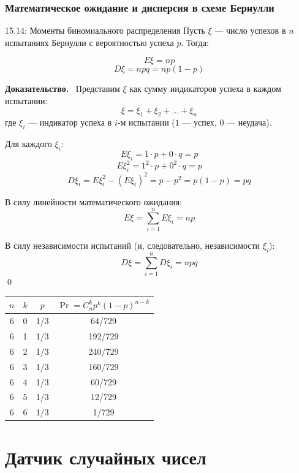\documentclass[a4paper,12pt]{article}
\newcommand{\myproof}{\textbf{Доказательство.}\ }
\begin{document}
	\subsubsection{Математическое ожидание и дисперсия в схеме Бернулли}
	
	\begin{theorembox}{15.14: Моменты биномиального распределения}
		Пусть \(\xi\) — число успехов в \(n\) испытаниях Бернулли с вероятностью успеха \(p\). Тогда:
		
		\[ E\xi = np \]
		\[ D\xi = npq = np(1-p) \]
	\end{theorembox}
	
	\myproof
	Представим \(\xi\) как сумму индикаторов успеха в каждом испытании:
	\[ \xi = \xi_1 + \xi_2 + \dots + \xi_n \]
	где \(\xi_i\) — индикатор успеха в \(i\)-м испытании (\(1\) — успех, \(0\) — неудача).
	
	Для каждого \(\xi_i\):
	\[ E\xi_i = 1 \cdot p + 0 \cdot q = p \]
	\[ E\xi_i^2 = 1^2 \cdot p + 0^2 \cdot q = p \]
	\[ D\xi_i = E\xi_i^2 - (E\xi_i)^2 = p - p^2 = p(1-p) = pq \]
	
	В силу линейности математического ожидания:
	\[ E\xi = \sum_{i=1}^n E\xi_i = np \]
	
	В силу независимости испытаний (и, следовательно, независимости \(\xi_i\)):
	\[ D\xi = \sum_{i=1}^n D\xi_i = npq \]
	\qed
	
	\begin{center}
		\begin{tabular}{|c|c|c|c|}
			\hline
			\(n\) & \(k\) & \(p\) & \(\Pr = C_n^k p^k (1-p)^{n-k}\) \\ \hline
			6 & 0 & 1/3 & 64/729 \\
			6 & 1 & 1/3 & 192/729 \\
			6 & 2 & 1/3 & 240/729 \\
			6 & 3 & 1/3 & 160/729 \\
			6 & 4 & 1/3 & 60/729 \\
			6 & 5 & 1/3 & 12/729 \\
			6 & 6 & 1/3 & 1/729 \\ \hline
		\end{tabular}
	\end{center}
	
	
	
	
	
	\newpage
	\section{Датчик случайных чисел}
	
\end{document}
